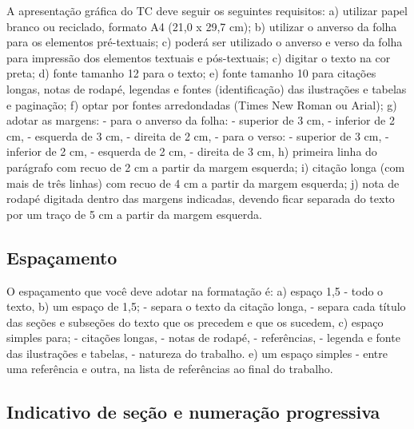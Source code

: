 \documentclass[12pt, openright, oneside, a4paper, brazil]{abntex2}
\begin{document}
A apresentação gráfica do TC deve seguir os seguintes requisitos:
a) utilizar papel branco ou reciclado, formato A4 (21,0 x 29,7 cm);
b) utilizar o anverso da folha para os elementos pré-textuais;
c) poderá ser utilizado o anverso e verso da folha para impressão dos elementos 
    textuais e pós-textuais;
c) digitar o texto na cor preta;
d) fonte tamanho 12 para o texto;
e) fonte tamanho 10 para citações longas, notas de rodapé, legendas e fontes 
    (identificação) das ilustrações e tabelas e paginação;
f) optar por fontes arredondadas (Times New Roman ou Arial);
g) adotar as margens:
    - para o anverso da folha:
       - superior de 3 cm, 
       - inferior de 2 cm,
       - esquerda de 3 cm,
       - direita de 2 cm,
     - para o verso:
        - superior de 3 cm, 
        - inferior de 2 cm,
        - esquerda de 2 cm,
       - direita de 3 cm,
h) primeira linha do parágrafo com recuo de 2 cm a partir da margem esquerda;
          i) citação longa (com mais de três linhas) com recuo de 4 cm a partir da margem
    esquerda;
j) nota de rodapé digitada dentro das margens indicadas, devendo ficar separada do 
   texto por um traço de 5 cm a partir da margem esquerda.

\subsection{Espaçamento}

O espaçamento que você deve adotar na formatação é:
a) espaço 1,5  - todo o texto,
          b) um espaço de 1,5;
     - separa o texto da citação longa,
     - separa cada título das seções e subseções do texto que os precedem e que os 
       sucedem,
c) espaço simples para;
    - citações longas,
    - notas de rodapé,
    - referências,
    - legenda e fonte das ilustrações e tabelas,
    - natureza do trabalho.
e) um espaço simples -  entre uma referência e outra, na lista de referências ao final do trabalho.

\subsection{Indicativo de seção e numeração progressiva}
\end{document}
